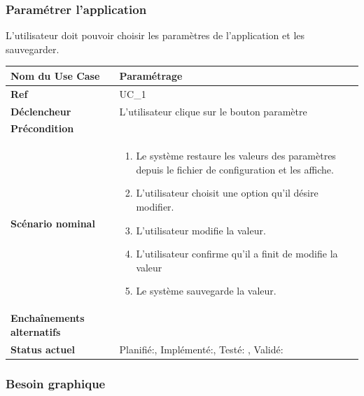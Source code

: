 		\subsubsection{Paramétrer l'application}
			L'utilisateur doit pouvoir choisir les paramètres de l'application et les sauvegarder.\\[0.2cm]
			\begin{longtable}{|l|p{10cm}|}
				\hline \textbf{Nom du Use Case} & Paramétrage \\ 
				\hline \textbf{Ref} & UC\_1  \\ 
				\hline \textbf{Déclencheur} & L'utilisateur clique sur le bouton paramètre \\
				\hline \textbf{Précondition} &  \\
				\hline \textbf{Scénario nominal} & 
				\begin{enumerate}
					\item Le système restaure les valeurs des paramètres depuis le fichier de configuration et les affiche.
					\item L'utilisateur choisit une option qu'il désire modifier.
					\item L'utilisateur modifie la valeur.
					\item \label{uc1Mod}L'utilisateur confirme qu'il a finit de modifie la valeur
					\item Le système sauvegarde la valeur.
				\end{enumerate}
				\\ 
				\hline \textbf{Enchaînements alternatifs} &  \\
				\hline \textbf{Status actuel} & Planifié:\CheckedBox , Implémenté:\CheckedBox , Testé: \CheckedBox , Validé: \CheckedBox \\
				\hline 
			\end{longtable} 
		\subsubsection*{Besoin graphique}

